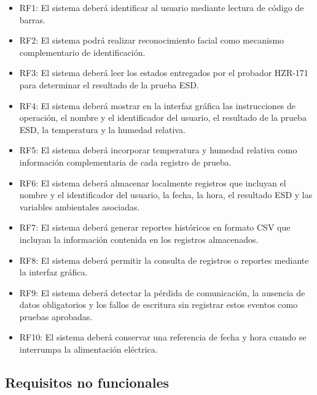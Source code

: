 \begin{itemize}
    \item RF1: El sistema deberá identificar al usuario mediante lectura de código de barras.

    \item RF2: El sistema podrá realizar reconocimiento facial como mecanismo complementario de identificación.

    \item RF3: El sistema deberá leer los estados entregados por el probador HZR-171 para determinar el resultado de la prueba ESD.

    \item RF4: El sistema deberá mostrar en la interfaz gráfica las instrucciones de operación, el nombre y el identificador del usuario, el resultado de la prueba ESD, la temperatura y la humedad relativa.

    \item RF5: El sistema deberá incorporar temperatura y humedad relativa como información complementaria de cada registro de prueba.

    \item RF6: El sistema deberá almacenar localmente registros que incluyan el nombre y el identificador del usuario, la fecha, la hora, el resultado ESD y las variables ambientales asociadas.

    \item RF7: El sistema deberá generar reportes históricos en formato CSV que incluyan la información contenida en los registros almacenados.

    \item RF8: El sistema deberá permitir la consulta de registros o reportes mediante la interfaz gráfica.

    \item RF9: El sistema deberá detectar la pérdida de comunicación, la
    ausencia de datos obligatorios y los fallos de escritura sin registrar estos
    eventos como pruebas aprobadas.

    \item RF10: El sistema deberá conservar una referencia de fecha y hora cuando se
    interrumpa la alimentación eléctrica.
\end{itemize}

\subsection{Requisitos no funcionales}

